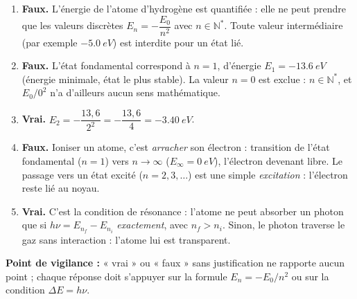 \documentclass[11pt]{article}
\newcommand{\cle}[1]{{\popxbold\color{popdark}#1}}
\begin{document}
\begin{corrige}
\begin{enumerate}
\item \textbf{Faux.} L'énergie de l'atome d'hydrogène est \cle{quantifiée} : elle ne peut prendre que les valeurs discrètes $E_n = -\dfrac{E_0}{n^2}$ avec $n \in \mathbb{N}^*$. Toute valeur intermédiaire (par exemple $-\SI{5,0}{eV}$) est interdite pour un état lié.
\item \textbf{Faux.} L'état fondamental correspond à $n = 1$, d'énergie $E_1 = -\SI{13,6}{eV}$ (énergie minimale, état le plus stable). La valeur $n = 0$ est exclue : $n \in \mathbb{N}^*$, et $E_0/0^2$ n'a d'ailleurs aucun sens mathématique.
\item \textbf{Vrai.} $E_2 = -\dfrac{13,6}{2^2} = -\dfrac{13,6}{4} = \SI{-3,40}{eV}$.
\item \textbf{Faux.} Ioniser un atome, c'est \emph{arracher} son électron : transition de l'état fondamental ($n=1$) vers $n \to \infty$ ($E_\infty = \SI{0}{eV}$), l'électron devenant libre. Le passage vers un état excité ($n = 2, 3, \dots$) est une simple \emph{excitation} : l'électron reste lié au noyau.
\item \textbf{Vrai.} C'est la \cle{condition de résonance} : l'atome ne peut absorber un photon que si $h\nu = E_{n_f} - E_{n_i}$ \emph{exactement}, avec $n_f > n_i$. Sinon, le photon traverse le gaz sans interaction : l'atome lui est transparent.
\end{enumerate}
\textbf{Point de vigilance :} « vrai » ou « faux » sans justification ne rapporte aucun point ; chaque réponse doit s'appuyer sur la formule $E_n = -E_0/n^2$ ou sur la condition $\Delta E = h\nu$.
\end{corrige}
\end{document}
